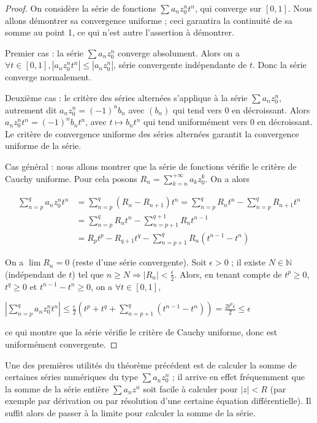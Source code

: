 \begin{proof}
On considère la série de fonctions $\sum a_n z_0^n t^n$, qui converge sur $[0,1]$. Nous allons démontrer sa convergence uniforme ; ceci garantira la continuité de sa somme au point 1, ce qui n'est autre l'assertion à démontrer.

Premier cas : la série $\sum a_n z_0^n$ converge absolument. Alors on a $\forall t \in [0,1], |a_n z_0^n t^n| \leq |a_n z_0^n|$, série convergente indépendante de $t$. Donc la série converge normalement.

Deuxième cas : le critère des séries alternées s'applique à la série $\sum a_n z_0^n$, autrement dit $a_n z_0^n = (-1)^n b_n$ avec $(b_n)$ qui tend vers 0 en décroissant. Alors $a_n z_0^n t^n = (-1)^n b_n t^n$, avec $t \mapsto b_n t^n$ qui tend uniformément vers 0 en décroissant. Le critère de convergence uniforme des séries alternées garantit la convergence uniforme de la série.

Cas général : nous allons montrer que la série de fonctions vérifie le critère de Cauchy uniforme. Pour cela posons $R_n = \sum_{k=n}^{+\infty} a_k z_0^k$. On a alors

\begin{align*}
\sum_{n=p}^q a_n z_0^n t^n &= \sum_{n=p}^q (R_n - R_{n+1}) t^n = \sum_{n=p}^q R_n t^n - \sum_{n=p}^q R_{n+1} t^n \\
&= \sum_{n=p}^q R_n t^n - \sum_{n=p+1}^{q+1} R_n t^{n-1} \\
&= R_p t^p - R_{q+1} t^q - \sum_{n=p+1}^q R_n (t^{n-1} - t^n)
\end{align*}

On a $\lim R_n = 0$ (reste d'une série convergente). Soit $\epsilon > 0$ ; il existe $N \in \mathbb{N}$ (indépendant de $t$) tel que $n \geq N \Rightarrow |R_n| < \frac{\epsilon}{2}$. Alors, en tenant compte de $t^p \geq 0$, $t^q \geq 0$ et $t^{n-1} - t^n \geq 0$, on a $\forall t \in [0,1]$,

$|\sum_{n=p}^q a_n z_0^n t^n| \leq \frac{\epsilon}{2} (t^p + t^q + \sum_{n=p+1}^q (t^{n-1} - t^n)) = \frac{2 t^p \epsilon}{2} \leq \epsilon$

ce qui montre que la série vérifie le critère de Cauchy uniforme, donc est uniformément convergente.
\end{proof}

\begin{rem}
Une des premières utilités du théorème précédent est de calculer la somme de certaines séries numériques du type $\sum a_n z_0^n$ ; il arrive en effet fréquemment que la somme de la série entière $\sum a_n z^n$ soit facile à calculer pour $|z| < R$ (par exemple par dérivation ou par résolution d'une certaine équation différentielle). Il suffit alors de passer à la limite pour calculer la somme de la série.
\end{rem}

